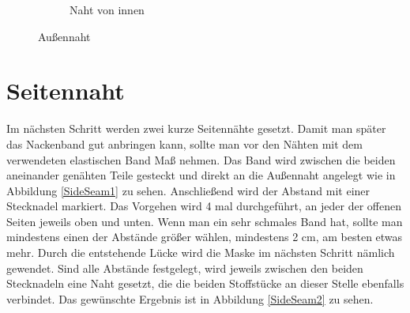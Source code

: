 \documentclass[12pt,parskip=full]{scrartcl}
\begin{document}
\begin{figure}[ht]
\begin{subfigure}{0.48\textwidth}
        \caption{Naht von innen}
        \label{OuterSeam6}
    \end{subfigure}
    \caption{Außennaht}
    \label{OuterSeamSecond}
\end{figure}


\section{Seitennaht}
Im nächsten Schritt werden zwei kurze Seitennähte gesetzt. Damit man später das Nackenband gut anbringen kann, sollte man vor den Nähten mit dem verwendeten elastischen Band Maß nehmen. Das Band wird zwischen die beiden aneinander genähten Teile gesteckt und direkt an die Außennaht angelegt wie in Abbildung \ref{SideSeam1} zu sehen. Anschließend wird der Abstand mit einer Stecknadel markiert. Das Vorgehen wird 4 mal durchgeführt, an jeder der offenen Seiten jeweils oben und unten. Wenn man ein sehr schmales Band hat, sollte man mindestens einen der Abstände größer wählen, mindestens 2 cm, am besten etwas mehr. Durch die entstehende Lücke wird die Maske im nächsten Schritt nämlich gewendet. Sind alle Abstände festgelegt, wird jeweils zwischen den beiden Stecknadeln eine Naht gesetzt, die die beiden Stoffstücke an dieser Stelle ebenfalls verbindet. Das gewünschte Ergebnis ist in Abbildung \ref{SideSeam2} zu sehen.
\end{document}
